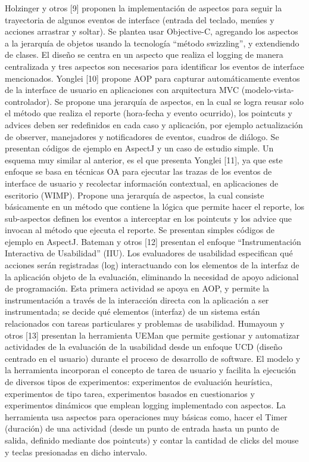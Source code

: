 Holzinger y otros [9] proponen la implementación de aspectos para seguir la trayectoria de algunos eventos de interface (entrada del teclado, menúes y acciones arrastrar y soltar). Se plantea usar Objective-C, agregando los aspectos a la jerarquía de objetos usando la tecnología “método swizzling”, y extendiendo de clases. El diseño se centra en un aspecto que realiza el logging de manera centralizada y tres aspectos son necesarios para identificar los eventos de interface mencionados. 
Yonglei [10] propone AOP para capturar automáticamente eventos de la interface de usuario en aplicaciones con arquitectura MVC (modelo-vista-controlador). Se propone una jerarquía de aspectos, en la cual se logra reusar solo el método que realiza el reporte (hora-fecha y evento ocurrido), los pointcuts y advices deben ser redefinidos en cada caso y aplicación, por ejemplo actualización de observer, manejadores y notificadores de eventos, cuadros de diálogo. Se presentan códigos de ejemplo en AspectJ y un caso de estudio simple.  
Un esquema muy similar al anterior, es el que presenta Yonglei [11], ya que este enfoque se basa en técnicas OA para ejecutar las trazas de los eventos de interface de usuario y recolectar información contextual, en aplicaciones de escritorio (WIMP). Propone una jerarquía de aspectos, la cual consiste básicamente en un método  que contiene la lógica que permite hacer el reporte, los sub-aspectos definen los eventos a interceptar en los pointcuts y los advice que invocan al método que ejecuta el reporte. Se presentan simples códigos de ejemplo en AspectJ.
Bateman y otros [12] presentan el enfoque “Instrumentación Interactiva de Usabilidad” (IIU). Los evaluadores de usabilidad especifican qué acciones serán registradas (log) interactuando con los elementos de la interfaz de la aplicación objeto de la evaluación, eliminando la necesidad de apoyo adicional de programación. Esta primera actividad se apoya en AOP, y permite la instrumentación a través de la interacción directa con la aplicación a ser instrumentada; se decide qué elementos (interfaz) de un sistema están relacionados con tareas particulares y problemas de usabilidad. 
Humayoun y otros [13] presentan la herramienta UEMan que permite gestionar y automatizar actividades de la evaluación de la usabilidad desde un enfoque UCD (diseño centrado en el usuario) durante el proceso de desarrollo de software. El modelo y la herramienta incorporan el concepto de tarea de usuario y facilita la ejecución de diversos tipos de experimentos: experimentos de evaluación heurística, experimentos de tipo tarea, experimentos basados en cuestionarios y experimentos dinámicos que emplean logging implementado con aspectos. La herramienta usa aspectos para operaciones muy básicas como, hacer el Timer (duración) de una actividad (desde un punto de entrada hasta un punto de salida, definido mediante dos pointcuts) y contar la cantidad de clicks del mouse y teclas presionadas en dicho intervalo.

